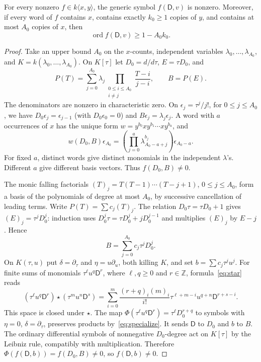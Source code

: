 \documentclass{article}
\newcommand{\DD}{\mathsf D}
\newcommand{\ord}{\operatorname{ord}}
\begin{document}
\begin{lemma}\label{lem:separation}
For every nonzero $f\in k\langle x,y\rangle$, the generic symbol $f(\DD,v)$ is nonzero. Moreover, if every word of $f$ contains $x$, contains exactly $k_0\geq1$ copies of $y$, and contains at most $A_0$ copies of $x$, then
\[
 \ord f(\DD,v)\geq1-A_0k_0.
\]
\end{lemma}
\begin{proof}
Take an upper bound $A_0$ on the $x$-counts, independent variables $\lambda_0,\ldots,\lambda_{A_0}$, and $K=k(\lambda_0,\ldots,\lambda_{A_0})$. On $K[\tau]$ let $D_0=d/d\tau$, $E=\tau D_0$, and
\[
 P(T)=\sum_{j=0}^{A_0}\lambda_j
   \prod_{\substack{0\leq i\leq A_0\\i\ne j}}\frac{T-i}{j-i},
 \qquad B=P(E).
\]
The denominators are nonzero in characteristic zero. On $\epsilon_j=\tau^j/j!$, for $0\leq j\leq A_0$, we have $D_0\epsilon_j=\epsilon_{j-1}$ (with $D_0\epsilon_0=0$) and $B\epsilon_j=\lambda_j\epsilon_j$. A word with $a$ occurrences of $x$ has the unique form
$w=y^{b_0}xy^{b_1}\cdots xy^{b_a}$, and
\[
 w(D_0,B)\epsilon_{A_0}
 =\left(\prod_{j=0}^a\lambda_{A_0-a+j}^{b_j}\right)\epsilon_{A_0-a}.
 \tag{3.2}\label{eq:separateword}
\]
For fixed $a$, distinct words give distinct monomials in the independent $\lambda$'s. Different $a$ give different basis vectors. Thus $f(D_0,B)\ne0$.

The monic falling factorials $(T)_j=T(T-1)\cdots(T-j+1)$, $0\leq j\leq A_0$, form a basis of the polynomials of degree at most $A_0$, by successive cancellation of leading terms. Write $P(T)=\sum c_j(T)_j$. The relation $D_0\tau=\tau D_0+1$ gives
$(E)_j=\tau^jD_0^j$: induction uses $D_0^j\tau=\tau D_0^j+jD_0^{j-1}$ and multiplies $(E)_j$ by $E-j$. Hence
\[
 B=\sum_{j=0}^{A_0}c_j\tau^jD_0^j.
\]
On $K(\tau,u)$ put $\delta=\partial_\tau$ and $\eta=u\partial_u$, both killing $K$, and set $b=\sum c_j\tau^ju^j$. For finite sums of monomials $\tau^\ell u^q\DD^r$, where $\ell,q\geq0$ and $r\in\mathbb Z$, formula~\eqref{eq:star} reads
\[
 (\tau^\ell u^q\DD^r)\star(\tau^m u^n\DD^s)
 =\sum_{i=0}^m\frac{(r+q)_i(m)_i}{i!}
 \tau^{\ell+m-i}u^{q+n}\DD^{r+s-i}.
 \tag{3.3}\label{eq:specialize}
\]
This space is closed under $\star$. The map
$\Phi(\tau^\ell u^q\DD^r)=\tau^\ell D_0^{r+q}$ to symbols with $\eta=0$, $\delta=\partial_\tau$, preserves products by~\eqref{eq:specialize}. It sends $\DD$ to $D_0$ and $b$ to $B$. The ordinary differential symbols of nonnegative $D_0$-degree act on $K[\tau]$ by the Leibniz rule, compatibly with multiplication. Therefore $\Phi(f(\DD,b))=f(D_0,B)\ne0$, so $f(\DD,b)\ne0$.


\end{proof}
\end{document}
